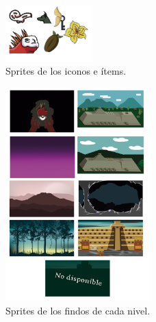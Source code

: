 \begin{figure}[H]
    \centering
    \includegraphics[width=0.30\textwidth]{Anexos/disenios/IconsItems.png}
    \caption{Sprites de los iconos e ítems.}
    \label{fig:backObjects}
\end{figure}

\begin{figure}[H]
    \centering
    \includegraphics[width=0.50\textwidth]{Anexos/disenios/Fondos.png}
    \caption{Sprites de los findos de cada nivel.}
    \label{fig:BG}
\end{figure}

